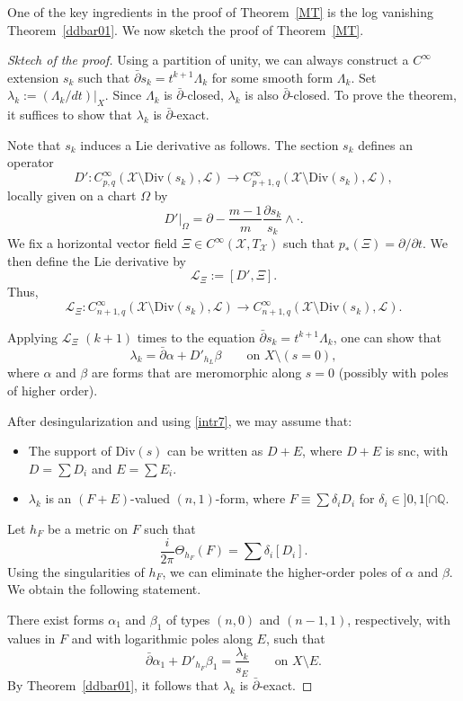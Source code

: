 \documentclass[english]{amsart}
\newcommand{\cX}{\mathcal{X}}
\newcommand{\Lie}{\mathcal{L}}
\newcommand{\Div}{\mathrm{Div}}
\newcommand{\dbar}{\bar \partial}
\numberwithin{equation}{thm}
\begin{document}
One of the key ingredients in the proof of Theorem~\ref{MT} is the log vanishing Theorem~\ref{ddbar01}. We now sketch the proof of Theorem~\ref{MT}.

\begin{proof}[Sktech of the proof]
	Using a partition of unity, we can always construct a $C^\infty$ extension $s_k$ such that $\dbar s_k = t^{k+1}\Lambda_k$ for some smooth form $\Lambda_k$.
	Set $\lambda_k := (\Lambda_k/dt)|_X$. Since $\Lambda_k$ is $\dbar$-closed, $\lambda_k$ is also $\dbar$-closed. To prove the theorem, it suffices to show that $\lambda_k$ is $\dbar$-exact.
	
	Note that $s_k$ induces a Lie derivative as follows. The section $s_k$ defines an operator
	\[
	D' : C^\infty_{p,q}(\cX \setminus \Div(s_k),\Lie)\to C^\infty_{p+1,q}(\cX \setminus \Div(s_k),\Lie),
	\]
	locally given on a chart $\Omega$ by
	\[
	D'|_{\Omega} = \partial - \frac{m-1}{m}\frac{\partial s_k}{s_k}\wedge \cdot .
	\]
	We fix a horizontal vector field $\Xi \in C^\infty(\cX,T_\cX)$ such that $p_\ast(\Xi)=\partial/\partial t$. We then define the Lie derivative by
	\[
	\Lie_\Xi := [D',\Xi].
	\]
	Thus,
	\[
	\Lie_\Xi : C^\infty_{n+1,q}(\cX \setminus \Div(s_k),\Lie)\to C^\infty_{n+1,q}(\cX \setminus \Div(s_k),\Lie).
	\]
	
	\medskip
	
	Applying $\Lie_\Xi$ $(k+1)$ times to the equation $\dbar s_k = t^{k+1}\Lambda_k$, one can show that
	\[
	\lambda_k = \dbar \alpha + D'_{h_L}\beta
	\qquad \text{on } X\setminus (s=0),
	\]
	where $\alpha$ and $\beta$ are forms that are meromorphic along $s=0$ (possibly with poles of higher order).
	
	\medskip
	
	After desingularization and using \eqref{intr7}, we may assume that:
	\begin{itemize}
		\item The support of $\Div(s)$ can be written as $D+E$, where $D+E$ is snc, with $D=\sum D_i$ and $E=\sum E_i$.
		\item $\lambda_k$ is an $(F+E)$-valued $(n,1)$-form, where $F\equiv \sum \delta_i D_i$ for $\delta_i \in ]0,1[\cap \mathbb Q$.
	\end{itemize}
	
	\medskip
	
	Let $h_F$ be a metric on $F$ such that
	\[
	\frac{i}{2\pi}\Theta_{h_F}(F)=\sum \delta_i [D_i].
	\]
	Using the singularities of $h_F$, we can eliminate the higher-order poles of $\alpha$ and $\beta$. We obtain the following statement.
	
	There exist forms $\alpha_1$ and $\beta_1$ of types $(n,0)$ and $(n-1,1)$, respectively, with values in $F$ and with logarithmic poles along $E$, such that
	\[
	\dbar \alpha_1 + D'_{h_F}\beta_1 = \frac{\lambda_k}{s_E}
	\qquad \text{on } X\setminus E.
	\]
	By Theorem~\ref{ddbar01}, it follows that $\lambda_k$ is $\dbar$-exact.
\end{proof}
\end{document}
